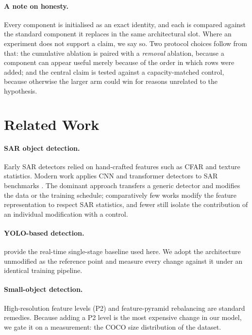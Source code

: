 \documentclass[10pt,twocolumn,letterpaper]{article}
\begin{document}
\paragraph{A note on honesty.} Every component is initialised as an exact
identity, and each is compared against the standard component it replaces in the
same architectural slot. Where an experiment does not support a claim, we say so.
Two protocol choices follow from that: the cumulative ablation is paired with a
\emph{removal} ablation, because a component can appear useful merely because of
the order in which rows were added; and the central claim is tested against a
capacity-matched control, because otherwise the larger arm could win for reasons
unrelated to the hypothesis.

\section{Related Work}
\label{sec:related}

\paragraph{SAR object detection.}
Early SAR detectors relied on hand-crafted features such as CFAR and
texture statistics. Modern work applies CNN and transformer detectors to SAR
benchmarks \cite{ssdd,hrsid,sardet100k,sarship}. The dominant approach transfers
a generic detector and modifies the data or the training schedule; comparatively
few works modify the feature representation to respect SAR statistics, and fewer
still isolate the contribution of an individual modification with a control.

\paragraph{YOLO-based detection.}
\cite{yolo,ultralytics} provide the real-time single-stage baseline used here.
We adopt the architecture unmodified as the reference point and measure every
change against it under an identical training pipeline.

\paragraph{Small-object detection.}
High-resolution feature levels (P2) and feature-pyramid rebalancing are standard
remedies. Because adding a P2 level is the most expensive change in our model, we
gate it on a measurement: the COCO size distribution of the dataset.
\end{document}
